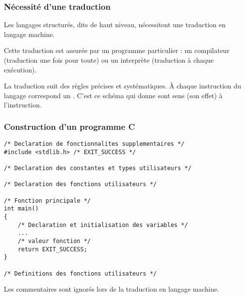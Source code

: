 \documentclass[xcolor=svgnames]{beamer}
\begin{document}
\begin{frame}
  \frametitle{Nécessité d'une traduction\nowrite}
  Les langages structurés, dits de haut niveau, nécessitent une \alert{traduction
  en langage machine}.\pause

Cette traduction est assurée par un programme particulier : un compilateur
 (traduction une fois pour toute) ou un interprète (traduction à
 chaque exécution).\pause

 La traduction suit des règles précises et systématiques. À chaque
 instruction du langage correspond un . C'est ce schéma qui donne sont sens (son effet) à
 l'instruction.
\end{frame}
\begin{frame}[fragile]
  \frametitle{Construction d'un programme C\nowrite}
\begin{lstlisting}[basicstyle=\ttfamily\scriptsize] 
/* Declaration de fonctionnalites supplementaires */
#include <stdlib.h> /* EXIT_SUCCESS */

/* Declaration des constantes et types utilisateurs */

/* Declaration des fonctions utilisateurs */

/* Fonction principale */
int main()
{
    /* Declaration et initialisation des variables */
    ...
    /* valeur fonction */
    return EXIT_SUCCESS;
}

/* Definitions des fonctions utilisateurs */
\end{lstlisting}

Les commentaires sont ignorés lors de la traduction en langage machine.
\end{frame}
\end{document}
